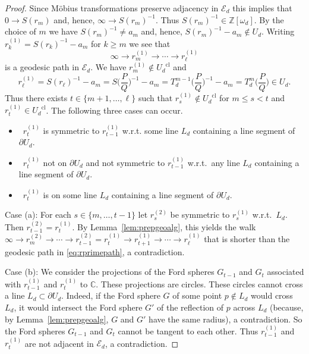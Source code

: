 \documentclass[10pt,a4paper]{amsart}
\begin{document}
\begin{proof}
Since M\"obius transformations preserve adjacency in $\mathcal{E}_d$ this implies that $0 \to S\left(r_m\right)$ and, hence, $\infty \to S\left(r_m\right)^{-1}$. Thus
$S\left(r_m\right)^{-1}\in\mathbb Z[\omega_{d}]$. By the choice of $m$ we have  $S\left(r_m\right)^{-1}\not=a_m$ and, hence, $S\left(r_m\right)^{-1}-a_m \notin U_d$. 
Writing $r_k^{(1)}=S\left(r_k\right)^{-1}-a_m$ for $k \geq m$ we see that  
\begin{equation}\label{eq:rprimepath}
\infty \to r_m^{(1)} \to \cdots \to r_\ell^{(1)}
\end{equation}
is a geodesic path in $\mathcal{E}_d$. We have $r_m^{(1)}\not\in{U_{d}}^{\mathrm{cl}}$ and  
\[
r_{\ell}^{(1)}=S(r_\ell)^{-1}-a_m= S\big(\frac PQ\big)^{-1}-a_m= T_{d}^{m-1}\big(\frac PQ\big)^{-1}-a_m = T_{d}^m\big(\frac PQ\big) \in U_{d}.
\]
Thus there exists $t\in\{m+1,\ldots,\ell\}$ such that $r_s^{(1)}\not\in {U_{d}}^{\mathrm{cl}}$ for $m \leq s<t$ and $r_t^{(1)}\in {U_{d}}^{\mathrm{cl}}$.  The following three cases can occur.
\begin{itemize}
\item[(a)]\,  $r_t^{(1)}$ is symmetric to $r_{t-1}^{(1)}$ w.r.t. some line $L_d$ containing a line segment of $\partial U_{d}$.
\item[(b)] \, $r_t^{(1)}$ not on $\partial U_{d}$  and not symmetric to $r_{t-1}^{(1)}$ w.r.t.\ any line $L_d$ containing a line segment of $\partial U_{d}$.
\item[(c)]\, $r_t^{(1)}$ is on some line $L_d$ containing a line segment of $\partial U_{d}$.
\end{itemize}

Case (a): For each $s\in\{m,\ldots, t-1\}$ let $r_s^{(2)}$ be symmetric to $r_s^{(1)}$ w.r.t.\ $L_d$. Then $r_{t-1}^{(2)}=r_t^{(1)}$. By Lemma~\ref{lem:prepgeoalg}, this yields the walk 
$\infty\to r_m^{(2)}\to \cdots \to r_{t-1}^{(2)}=r_t^{(1)}\to r_{t+1}^{(1)} \to \cdots \to r_\ell^{(1)}$ that is shorter than the geodesic path in \eqref{eq:rprimepath}, a contradiction.

Case (b): We consider the projections of the Ford spheres $G_{t-1}$ and $G_t$ associated with $r_{t-1}^{(1)}$ and $r_t^{(1)}$ to $\mathbb{C}$. These projections are circles. These circles cannot cross a line $L_d\subset \partial U_{d}$. Indeed, if the Ford sphere $G$ of some point $p\not\in L_d$ would cross $L_d$, it would intersect the Ford sphere $G'$ of the reflection of $p$ across $L_d$ (because, by Lemma~\ref{lem:prepgeoalg}, $G$ and $G'$ have the same radius), a contradiction.  So the Ford spheres $G_{t-1}$ and $G_t$ cannot be tangent to each other. Thus $r_{t-1}^{(1)}$ and $r_t^{(1)}$ are not adjacent in $\mathcal{E}_d$, a contradiction. 


\end{proof}
\end{document}
